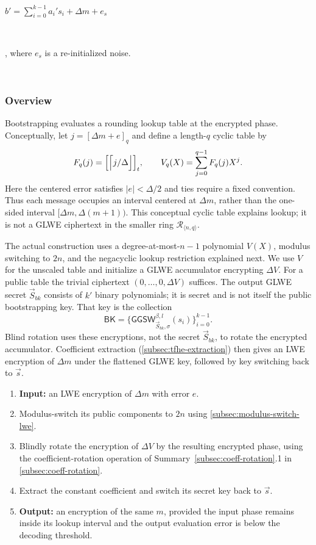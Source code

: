 $ $

$b' = \sum\limits_{i=0}^{k-1} a_i's_i + \Delta m + e_s$

$ $

, where $e_s$ is a re-initialized noise. 

$ $
\subsubsection{Overview}
\label{subsec:bootstrapping-overview}

Bootstrapping evaluates a rounding lookup table at the encrypted phase. Conceptually, let $j=[\Delta m+e]_q$ and define a length-$q$ cyclic table by
\[
F_q(j)=\Bigl[\Bigl\lceil j/\Delta\Bigr\rfloor\Bigr]_t,
\qquad V_q(X)=\sum_{j=0}^{q-1}F_q(j)X^j.
\]
Here the centered error satisfies $|e|<\Delta/2$ and ties require a fixed convention. Thus each message occupies an interval centered at $\Delta m$, rather than the one-sided interval $[\Delta m,\Delta(m+1))$. This conceptual cyclic table explains lookup; it is not a GLWE ciphertext in the smaller ring $\mathcal R_{\langle n,q\rangle}$.

The actual construction uses a degree-at-most-$n-1$ polynomial $V(X)$, modulus switching to $2n$, and the negacyclic lookup restriction explained next. We use $V$ for the unscaled table and initialize a GLWE accumulator encrypting $\Delta V$. For a public table the trivial ciphertext $(0,\ldots,0,\Delta V)$ suffices. The output GLWE secret $\vec S_{bk}$ consists of $k'$ binary polynomials; it is secret and is not itself the public bootstrapping key. That key is the collection
\[
\textsf{BK}=\{\textsf{GGSW}_{\vec S_{bk},\sigma}^{\beta,l}(s_i)\}_{i=0}^{k-1}.
\]
Blind rotation uses these encryptions, not the secret $\vec S_{bk}$, to rotate the encrypted accumulator. Coefficient extraction (\autoref{subsec:tfhe-extraction}) then gives an LWE encryption of $\Delta m$ under the flattened GLWE key, followed by key switching back to $\vec s$.

\begin{enumerate}
\item \textbf{Input:} an LWE encryption of $\Delta m$ with error $e$.
\item Modulus-switch its public components to $2n$ using \autoref{subsec:modulus-switch-lwe}.
\item Blindly rotate the encryption of $\Delta V$ by the resulting encrypted phase, using the coefficient-rotation operation of Summary~\ref*{subsec:coeff-rotation}.1 in \autoref{subsec:coeff-rotation}.
\item Extract the constant coefficient and switch its secret key back to $\vec s$.
\item \textbf{Output:} an encryption of the same $m$, provided the input phase remains inside its lookup interval and the output evaluation error is below the decoding threshold.
\end{enumerate}

